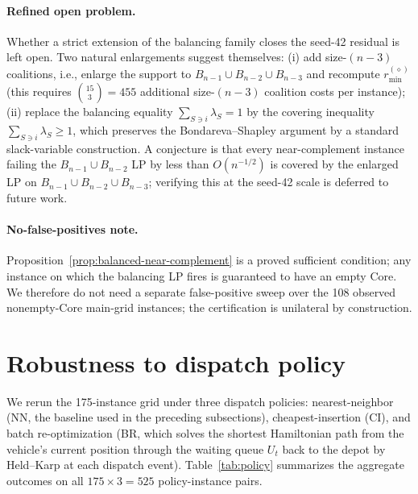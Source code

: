 \documentclass[11pt]{article}
\theoremstyle{plain}
\theoremstyle{definition}
\theoremstyle{remark}
\begin{document}
\paragraph{Refined open problem.} Whether a strict extension of the balancing family closes the seed-42 residual is left open. Two natural enlargements suggest themselves: (i) add size-$(n-3)$ coalitions, i.e., enlarge the support to $B_{n-1}\cup B_{n-2}\cup B_{n-3}$ and recompute $r^{(\diamond)}_{\min}$ (this requires $\binom{15}{3}=455$ additional size-$(n-3)$ coalition costs per instance); (ii) replace the balancing equality $\sum_{S\ni i}\lambda_S=1$ by the covering inequality $\sum_{S\ni i}\lambda_S\ge 1$, which preserves the Bondareva--Shapley argument by a standard slack-variable construction. A conjecture is that every near-complement instance failing the $B_{n-1}\cup B_{n-2}$ LP by less than $O(n^{-1/2})$ is covered by the enlarged LP on $B_{n-1}\cup B_{n-2}\cup B_{n-3}$; verifying this at the seed-42 scale is deferred to future work.

\paragraph{No-false-positives note.} Proposition~\ref{prop:balanced-near-complement} is a proved sufficient condition; any instance on which the balancing LP fires is guaranteed to have an empty Core. We therefore do not need a separate false-positive sweep over the 108 observed nonempty-Core main-grid instances; the certification is unilateral by construction.

\section{Robustness to dispatch policy}
\label{secS:robustness-detail}

We rerun the 175-instance grid under three dispatch policies: nearest-neighbor (NN, the baseline used in the preceding subsections), cheapest-insertion (CI), and batch re-optimization (BR, which solves the shortest Hamiltonian path from the vehicle's current position through the waiting queue $U_t$ back to the depot by Held--Karp at each dispatch event). Table~\ref{tab:policy} summarizes the aggregate outcomes on all $175\times 3 = 525$ policy-instance pairs.
\end{document}
